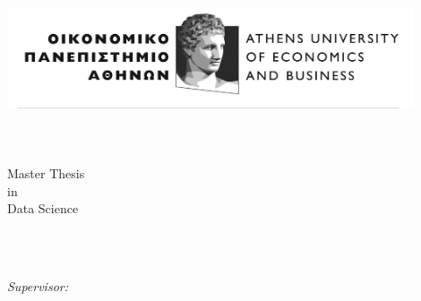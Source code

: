 %


\begin{titlepage}
	\tgherosfont
	\centering
	
	{\Large \thesisUniversity} \\[4mm]
	\includegraphics[width=12cm]{figs/aueb_logo.jpg} \\[2mm]
	\textsf{\thesisUniversityInstitute} \\
	\textsf{\thesisUniversityDepartment} \\
	\textsf{\thesisUniversityCity} \\
	\vfill
	\Large{Master Thesis} \\
	\textsf{in} \\
	\Large{Data Science}
	
	\vfill
	
	{\LARGE \textbf{\thesisTitle} \\[4mm]}
	{\Large \thesisAuthor} \\
	
	\vfill
	\vfill
	
	
	\begin{minipage}[t]{.27\textwidth}
		\raggedleft
		\textit{Supervisor:}
	\end{minipage}
	\hspace*{15pt}
	\begin{minipage}[t]{.65\textwidth}
		{\Large \thesisSupervisorTitle\ \thesisSupervisor} \\
		{\small \thesisSupervisorDepartment} \\[-1mm]
		{\small \thesisSupervisorUniversity}
	\end{minipage} \\[15mm]
	

\end{titlepage}
